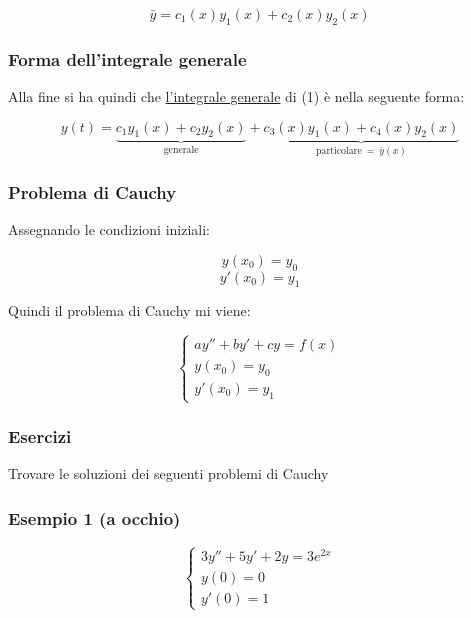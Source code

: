 \[ \bar{y} = c_1(x)y_1(x) + c_2(x)y_2(x)\]

\filbreak{}

\subsubsection{Forma dell'integrale generale}

Alla fine si ha quindi che \underline{l'integrale generale} di (1) è nella seguente forma:

\[
    y(t)  = \underbrace{c_1 y_1(x) + c_2 y_2(x)}_\text{generale} + \underbrace{c_3(x) y_1(x) + c_4(x) y_2(x)}_{\text{particolare}\ =\ \bar{y}(x)}
\]

\subsubsection{Problema di Cauchy}

Assegnando le condizioni iniziali:

\[
    y(x_0) = y_0
\]
\[
    y'(x_0) = y_1
\]

Quindi il problema di Cauchy mi viene:

\begin{equation*}
    \begin{cases*}
        ay''+ by'+cy= f(x) \\
        y(x_0)=y_0         \\
        y'(x_0) = y_1
    \end{cases*}
\end{equation*}

\pagebreak{}

\subsubsection{Esercizi}

Trovare le soluzioni dei seguenti problemi di Cauchy

\subsubsection*{Esempio 1 (a occhio)}

\begin{equation*}
    \begin{cases*}
        3y'' + 5y' + 2y=3e ^{2x} \\
        y(0) = 0                 \\
        y'(0) = 1
    \end{cases*}
\end{equation*}

